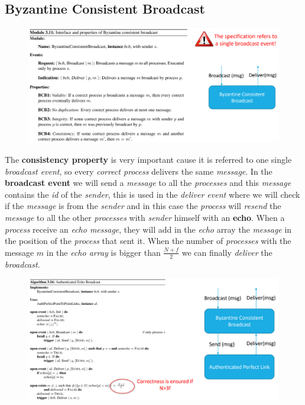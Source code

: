 \documentclass{article}
\begin{document}
\subsection{Byzantine Consistent Broadcast}
\begin{figure}[H]
  \centering
  \includegraphics[scale=0.8]{cattura80.png}
\end{figure}
The \textbf{consistency property} is very important cause it is referred to one single \emph{broadcast event}, so every \emph{correct process} delivers the same \emph{message}. In the \textbf{broadcast event} we will send a \emph{message} to all the \emph{processes} and this \emph{message} contains the \emph{id} of the \emph{sender}, this is used in the \emph{deliver event} where we will check if the \emph{message} is from the \emph{sender} and in this case the \emph{process} will \emph{resend} the \emph{message} to all the other \emph{processes} with \emph{sender} himself with an \textbf{echo}. When a \emph{process} receive an \emph{echo message}, they will add in the \emph{echo} array the \emph{message} in the position of the \emph{process} that sent it. When the number of \emph{processes} with the message $m$ in the \emph{echo array} is bigger than $\frac{N+f}{2}$ we can finally \emph{deliver} the \emph{broadcast}. 
\begin{figure}[H]
  \centering
  \includegraphics[scale=0.8]{cattura81.png}
\end{figure}
\end{document}
